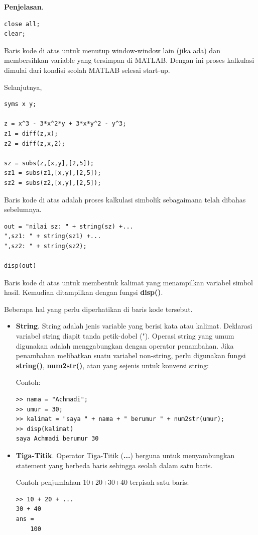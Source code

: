 \documentclass[12pt]{book}
\begin{document}
	\textbf{Penjelasan}.
	\begin{verbatim}
close all;
clear;
	\end{verbatim}

	Baris kode di atas untuk menutup window-window lain (jika ada) dan membersihkan variable yang tersimpan di MATLAB.
	Dengan ini proses kalkulasi dimulai dari kondisi seolah MATLAB selesai start-up.

	\newpage
	Selanjutnya,
	\begin{verbatim}
syms x y;

z = x^3 - 3*x^2*y + 3*x*y^2 - y^3;
z1 = diff(z,x);
z2 = diff(z,x,2);

sz = subs(z,[x,y],[2,5]);
sz1 = subs(z1,[x,y],[2,5]);
sz2 = subs(z2,[x,y],[2,5]);
	\end{verbatim}

	Baris kode di atas adalah proses kalkulasi simbolik sebagaimana telah dibahas sebelumnya.

	\begin{verbatim}
out = "nilai sz: " + string(sz) +...
",sz1: " + string(sz1) +...
",sz2: " + string(sz2);

disp(out)
	\end{verbatim}

	Baris kode di atas untuk membentuk kalimat yang menampilkan variabel simbol hasil.
	Kemudian ditampilkan dengan fungsi \textbf{disp()}.

	Beberapa hal yang perlu diperhatikan di baris kode tersebut.
	\begin{itemize}
		\item \textbf{String}. String adalah jenis variable yang berisi kata atau kalimat.
		Deklarasi variabel string diapit tanda petik-dobel (").
		Operasi string yang umum digunakan adalah menggabungkan dengan operator penambahan.
		Jika penambahan melibatkan suatu variabel non-string, perlu digunakan fungsi \textbf{string()}, \textbf{num2str()},
		atau yang sejenis untuk konversi string:

		Contoh:
		\begin{verbatim}
>> nama = "Achmadi";
>> umur = 30;
>> kalimat = "saya " + nama + " berumur " + num2str(umur);
>> disp(kalimat)
saya Achmadi berumur 30
		\end{verbatim}

		\item \textbf{Tiga-Titik}. Operator Tiga-Titik (\textbf{...}) berguna untuk menyambungkan statement yang berbeda baris
		sehingga seolah dalam satu baris.

		Contoh penjumlahan 10+20+30+40 terpisah satu baris:
		\begin{verbatim}
>> 10 + 20 + ...
30 + 40
ans =
    100
    	\end{verbatim}
	\end{itemize}
\end{document}
